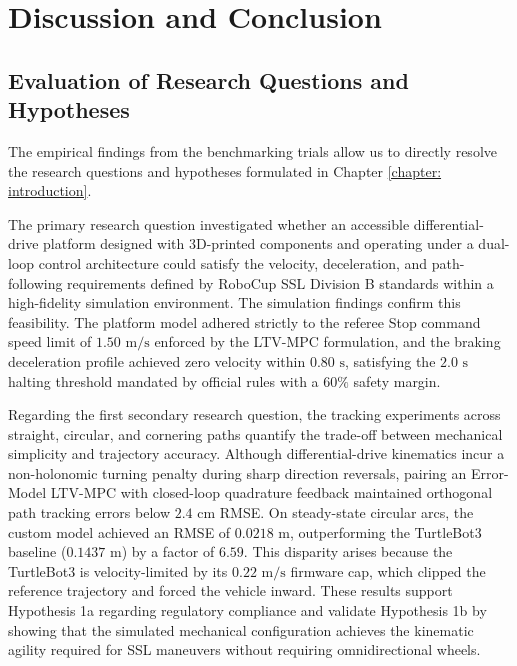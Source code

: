 \documentclass[a4paper,twoside,12pt]{report}
\begin{document}
\chapter{Discussion and Conclusion}\label{chapter: discussion}

\section{Evaluation of Research Questions and Hypotheses}

The empirical findings from the benchmarking trials allow us to directly resolve the research questions and hypotheses formulated in Chapter \ref{chapter: introduction}.

The primary research question investigated whether an accessible differential-drive platform designed with 3D-printed components and operating under a dual-loop control architecture could satisfy the velocity, deceleration, and path-following requirements defined by RoboCup SSL Division B standards within a high-fidelity simulation environment. The simulation findings confirm this feasibility. The platform model adhered strictly to the referee Stop command speed limit of $1.50\text{ m/s}$ enforced by the LTV-MPC formulation, and the braking deceleration profile achieved zero velocity within $0.80\text{ s}$, satisfying the $2.0\text{ s}$ halting threshold mandated by official rules \citep{ssl_rules_2026} with a $60\%$ safety margin.

Regarding the first secondary research question, the tracking experiments across straight, circular, and cornering paths quantify the trade-off between mechanical simplicity and trajectory accuracy. Although differential-drive kinematics incur a non-holonomic turning penalty during sharp direction reversals, pairing an Error-Model LTV-MPC with closed-loop quadrature feedback maintained orthogonal path tracking errors below $2.4\text{ cm}$ RMSE. On steady-state circular arcs, the custom model achieved an RMSE of $0.0218\text{ m}$, outperforming the TurtleBot3 baseline ($0.1437\text{ m}$) by a factor of $6.59$. This disparity arises because the TurtleBot3 is velocity-limited by its $0.22\text{ m/s}$ firmware cap, which clipped the reference trajectory and forced the vehicle inward. These results support Hypothesis 1a regarding regulatory compliance and validate Hypothesis 1b by showing that the simulated mechanical configuration achieves the kinematic agility required for SSL maneuvers without requiring omnidirectional wheels.
\end{document}
